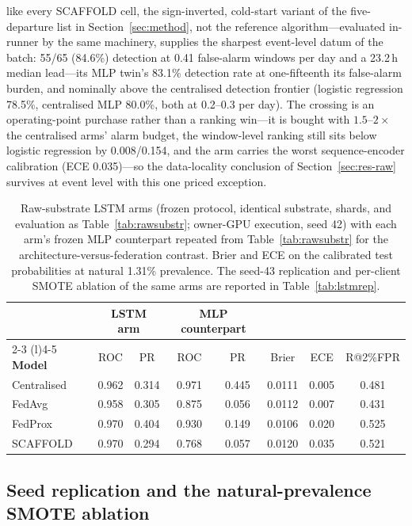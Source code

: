 like every SCAFFOLD cell, the sign-inverted, cold-start variant of
the five-departure list in Section~\ref{sec:method}, not the
reference algorithm---evaluated in-runner by the same machinery,
supplies the sharpest
event-level datum of the batch: 55/65 (84.6\%) detection at 0.41
false-alarm windows per day and a 23.2\,h median lead---its MLP
twin's 83.1\% detection rate at one-fifteenth its false-alarm
burden, and nominally above the centralised detection frontier
(logistic regression 78.5\%, centralised MLP 80.0\%, both at
0.2--0.3 per day). The crossing is an operating-point purchase
rather than a ranking win---it is bought with $1.5$--$2\times$ the
centralised arms' alarm budget, the window-level ranking still
sits below logistic regression by 0.008/0.154, and the arm carries
the worst sequence-encoder calibration (ECE 0.035)---so the
data-locality conclusion of Section~\ref{sec:res-raw} survives at
event level with this one priced exception.

\begin{table}[t]
\centering
\caption{Raw-substrate LSTM arms (frozen protocol, identical
substrate, shards, and evaluation as Table~\ref{tab:rawsubstr};
owner-GPU execution, seed 42) with each arm's frozen MLP counterpart
repeated from Table~\ref{tab:rawsubstr} for the
architecture-versus-federation contrast. Brier and ECE on the
calibrated test probabilities at natural 1.31\% prevalence. The
seed-43 replication and per-client SMOTE ablation of the same arms
are reported in Table~\ref{tab:lstmrep}.}
\label{tab:lstmraw}
\small
\begin{tabular}{@{}l cc cc c c c@{}}
\toprule
 & \multicolumn{2}{c}{\textbf{LSTM arm}} &
 \multicolumn{2}{c}{\textbf{MLP counterpart}} & & & \\
\cmidrule(r){2-3} \cmidrule(l){4-5}
\textbf{Model} & ROC & PR & ROC & PR & Brier & ECE & R@2\%FPR \\
\midrule
Centralised & 0.962 & 0.314 & 0.971 & 0.445 & 0.0111 & 0.005 & 0.481 \\
FedAvg & 0.958 & 0.305 & 0.875 & 0.056 & 0.0112 & 0.007 & 0.431 \\
FedProx & 0.970 & 0.404 & 0.930 & 0.149 & 0.0106 & 0.020 & 0.525 \\
SCAFFOLD & 0.970 & 0.294 & 0.768 & 0.057 & 0.0120 & 0.035 & 0.521 \\
\bottomrule
\end{tabular}
\end{table}

\subsection{Seed replication and the natural-prevalence SMOTE
ablation}
\label{sec:res-lstmrep}

